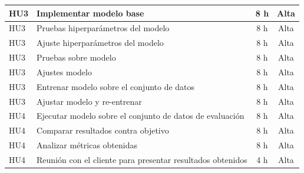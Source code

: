 \documentclass[
11pt, %
]{charter}
\begin{document}
\begin{table}[H]
\begin{tabularx}{\linewidth}{@{}|l|X|c|c|@{}}
HU3 & Implementar modelo base & 8 h & Alta \\ \hline
HU3 & Pruebas hiperparámetros del modelo & 8 h & Alta \\ \hline
HU3 & Ajuste hiperparámetros del modelo & 8 h & Alta \\ \hline
HU3 & Pruebas sobre modelo & 8 h & Alta \\ \hline
HU3 & Ajustes modelo & 8 h & Alta \\ \hline

HU3 & Entrenar modelo sobre el conjunto de datos & 8 h & Alta \\ \hline
HU3 & Ajustar modelo y re-entrenar & 8 h & Alta \\ \hline

HU4 & Ejecutar modelo sobre el conjunto de datos de evaluación & 8 h & Alta \\ \hline
HU4 & Comparar resultados contra objetivo & 8 h & Alta \\ \hline
HU4 & Analizar métricas obtenidas & 8 h & Alta \\ \hline
HU4 & Reunión con el cliente para presentar resultados obtenidos & 4 h & Alta \\ \hline

\end{tabularx}
\end{table}
\end{document}
